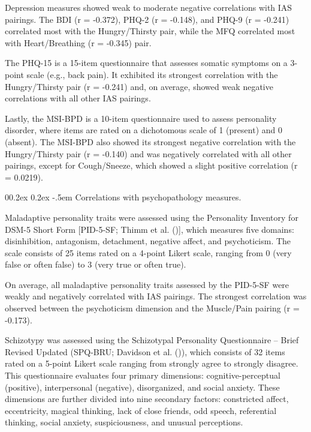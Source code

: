\documentclass[
  man,
  floatsintext,
  longtable,
  nolmodern,
  notxfonts,
  notimes,
  colorlinks=true,linkcolor=blue,citecolor=blue,urlcolor=blue]{apa7}
\makeatletter
\renewcommand{\paragraph}{\@startsection{paragraph}{4}{\parindent}%
	{0\baselineskip \@plus 0.2ex \@minus 0.2ex}%
	{-.5em}%
	{\normalfont\normalsize\bfseries\typesectitle}}
\makeatother
\begin{document}
Depression measures showed weak to moderate negative correlations with
IAS pairings. The BDI (r = -0.372), PHQ-2 (r = -0.148), and PHQ-9 (r =
-0.241) correlated most with the Hungry/Thirsty pair, while the MFQ
correlated most with Heart/Breathing (r = -0.345) pair.

The PHQ-15 is a 15-item questionnaire that assesses somatic symptoms on
a 3-point scale (e.g., back pain). It exhibited its strongest
correlation with the Hungry/Thirsty pair (r = -0.241) and, on average,
showed weak negative correlations with all other IAS pairings.

Lastly, the MSI-BPD is a 10-item questionnaire used to assess
personality disorder, where items are rated on a dichotomous scale of 1
(present) and 0 (absent). The MSI-BPD also showed its strongest negative
correlation with the Hungry/Thirsty pair (r = -0.140) and was negatively
correlated with all other pairings, except for Cough/Sneeze, which
showed a slight positive correlation (r = 0.0219).

\paragraph{Correlations with psychopathology
measures.}\label{correlations-with-psychopathology-measures}

Maladaptive personality traits were assessed using the Personality
Inventory for DSM-5 Short Form {[}PID-5-SF; Thimm et al.
(){]}, which measures five
domains: disinhibition, antagonism, detachment, negative affect, and
psychoticism. The scale consists of 25 items rated on a 4-point Likert
scale, ranging from 0 (very false or often false) to 3 (very true or
often true).

On average, all maladaptive personality traits assessed by the PID-5-SF
were weakly and negatively correlated with IAS pairings. The strongest
correlation was observed between the psychoticism dimension and the
Muscle/Pain pairing (r = -0.173).

Schizotypy was assessed using the Schizotypal Personality Questionnaire
-- Brief Revised Updated (SPQ-BRU; Davidson et al.
()), which consists of 32
items rated on a 5-point Likert scale ranging from strongly agree to
strongly disagree. This questionnaire evaluates four primary dimensions:
cognitive-perceptual (positive), interpersonal (negative), disorganized,
and social anxiety. These dimensions are further divided into nine
secondary factors: constricted affect, eccentricity, magical thinking,
lack of close friends, odd speech, referential thinking, social anxiety,
suspiciousness, and unusual perceptions.
\end{document}
